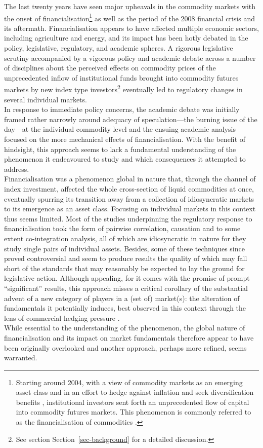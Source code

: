 \documentclass[
  authoryear,
  preprint,
  3p]{elsarticle}
\begin{document}
The last twenty years have seen major upheavals in the commodity markets
with the onset of financialisation\footnote{Starting around 2004, with a
  view of commodity markets as an emerging asset class and in an effort
  to hedge against inflation and seek diversification benefits
  \citep{buyuksahin_speculators_2014, singleton_investor_2013},
  institutional investors sent forth an unprecedented flow of capital
  into commodity futures markets. This phenomenon is commonly referred
  to as the financialisation of commodities
  \citep{domanski_financial_2007}.} as well as the period of the 2008
financial crisis and its aftermath. Financialisation appears to have
affected multiple economic sectors, including agriculture and energy,
and its impact has been hotly debated in the policy, legislative,
regulatory, and academic spheres. A rigorous legislative scrutiny
accompanied by a vigorous policy and academic debate across a number of
disciplines about the perceived effects on commodity prices of the
unprecedented inflow of institutional funds brought into commodity
futures markets by new index type investors\footnote{See section
  Section~\ref{sec-background} for a detailed discussion.} eventually
led to regulatory changes in several individual markets.\\
In response to immediate policy concerns, the academic debate was
initially framed rather narrowly around adequacy of speculation---the
burning issue of the day---at the individual commodity level and the
ensuing academic analysis focused on the more mechanical effects of
financialisation. With the benefit of hindsight, this approach seems to
lack a fundamental understanding of the phenomenon it endeavoured to
study and which consequences it attempted to address.\\
Financialisation was a phenomenon global in nature that, through the
channel of index investment, affected the whole cross-section of liquid
commodities at once, eventually spurring its transition away from a
collection of idiosyncratic markets to its emergence as an asset class.
Focusing on individual markets in this context thus seems limited. Most
of the studies underpinning the regulatory response to financialisation
took the form of pairwise correlation, causation and to some extent
co-integration analysis, all of which are idiosyncratic in nature for
they study single pairs of individual assets. Besides, some of these
techniques since proved controversial and seem to produce results the
quality of which may fall short of the standards that may reasonably be
expected to lay the ground for legislative action. Although appealing,
for it comes with the promise of prompt ``significant'' results, this
approach misses a critical corollary of the substantial advent of a new
category of players in a (set of) market(s): the alteration of
fundamentals it potentially induces, best observed in this context
through the lens of commercial hedging pressure
\citep{keynes_treatise_1930, hicks_value_1939}.\\
While essential to the understanding of the phenomenon, the global
nature of financialisation and its impact on market fundamentals
therefore appear to have been originally overlooked and another
approach, perhaps more refined, seems warranted.
\end{document}
